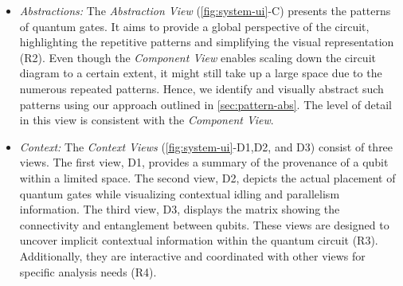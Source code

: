 \begin{itemize}[leftmargin=10pt, noitemsep]
  \item \emph{Abstractions:}
    The \emph{Abstraction View} (\cref{fig:system-ui}-C) presents the patterns of quantum gates.
    It aims to provide a global perspective of the circuit, highlighting the repetitive patterns and simplifying the visual representation ({R2}).
    Even though the \emph{Component View} enables scaling down the circuit diagram to a certain extent, it might still take up a large space due to the numerous repeated patterns.
    Hence, we identify and visually abstract such patterns using our approach outlined in \cref{sec:pattern-abs}.
    The level of detail in this view is consistent with the \emph{Component View}.

  \item \emph{Context:}
    The \emph{Context Views} (\cref{fig:system-ui}-D1,D2, and D3) consist of three views.
    The first view, D1, provides a summary of the provenance of a qubit within a limited space.
    The second view, D2, depicts the actual placement of quantum gates while visualizing contextual idling and parallelism information.
    The third view, D3, displays the matrix showing the connectivity and entanglement between qubits.
    These views are designed to uncover implicit contextual information within the quantum circuit ({R3}).
    Additionally, they are interactive and coordinated with other views for specific analysis needs ({R4}).
    
\end{itemize}

